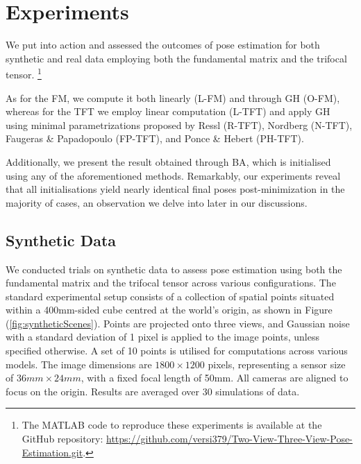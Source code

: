 \pagebreak

\section{Experiments}\label{sec:experiments}
We put into action and assessed the outcomes of pose estimation for both synthetic and real data employing both the fundamental matrix and the trifocal tensor. \footnote{The MATLAB code to reproduce these experiments is available at the GitHub repository: \href{https://github.com/versi379/Two-View-Three-View-Pose-Estimation.git}{https://github.com/versi379/Two-View-Three-View-Pose-Estimation.git}.}

As for the \acs{FM}, we compute it both linearly (\acs{L-FM}) and through \acs{GH} (\acs{O-FM}), whereas for the \acs{TFT} we employ linear computation (\acs{L-TFT}) and apply \acs{GH} using minimal parametrizations proposed by Ressl (\acs{R-TFT}), Nordberg (\acs{N-TFT}), Faugeras \& Papadopoulo (\acs{FP-TFT}), and Ponce \& Hebert (\acs{PH-TFT}).

Additionally, we present the result obtained through \acs{BA}, which is initialised using any of the aforementioned methods. Remarkably, our experiments reveal that all initialisations yield nearly identical final poses post-minimization in the majority of cases, an observation we delve into later in our discussions.

\subsection{Synthetic Data}
We conducted trials on synthetic data to assess pose estimation using both the fundamental matrix and the trifocal tensor across various configurations. The standard experimental setup consists of a collection of spatial points situated within a 400mm-sided cube centred at the world's origin, as shown in Figure (\ref{fig:syntheticScenes}). Points are projected onto three views, and Gaussian noise with a standard deviation of 1 pixel is applied to the image points, unless specified otherwise. A set of 10 points is utilised for computations across various models. The image dimensions are \( 1800 \times 1200 \) pixels, representing a sensor size of \( 36mm \times 24mm \), with a fixed focal length of 50mm. All cameras are aligned to focus on the origin. Results are averaged over 30 simulations of data.\\

